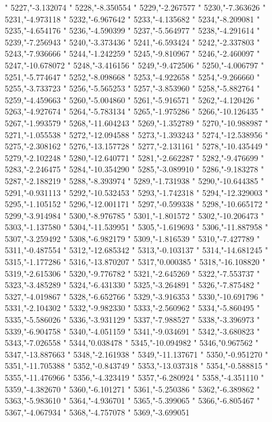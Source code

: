 "
5227,"-3.132074
"
5228,"-8.350554
"
5229,"-2.267577
"
5230,"-7.363626
"
5231,"-4.973118
"
5232,"-6.967642
"
5233,"-4.135682
"
5234,"-8.209081
"
5235,"-4.654176
"
5236,"-4.590399
"
5237,"-5.564977
"
5238,"-4.291614
"
5239,"-7.256943
"
5240,"-3.373436
"
5241,"-6.593424
"
5242,"-2.337803
"
5243,"-7.936666
"
5244,"-1.242259
"
5245,"-9.810967
"
5246,"-2.460097
"
5247,"-10.678072
"
5248,"-3.416156
"
5249,"-9.472506
"
5250,"-4.006797
"
5251,"-5.774647
"
5252,"-8.098668
"
5253,"-4.922658
"
5254,"-9.266660
"
5255,"-3.733723
"
5256,"-5.565253
"
5257,"-3.853960
"
5258,"-5.882764
"
5259,"-4.459663
"
5260,"-5.004860
"
5261,"-5.916571
"
5262,"-4.120426
"
5263,"-4.927674
"
5264,"-5.783134
"
5265,"-1.975286
"
5266,"-10.126435
"
5267,"-1.993579
"
5268,"-11.604243
"
5269,"-1.352789
"
5270,"-10.988987
"
5271,"-1.055538
"
5272,"-12.094588
"
5273,"-1.393243
"
5274,"-12.538956
"
5275,"-2.308162
"
5276,"-13.157728
"
5277,"-2.131161
"
5278,"-10.435449
"
5279,"-2.102248
"
5280,"-12.640771
"
5281,"-2.662287
"
5282,"-9.476699
"
5283,"-2.246475
"
5284,"-10.354290
"
5285,"-3.089910
"
5286,"-9.183278
"
5287,"-2.188219
"
5288,"-8.393974
"
5289,"-1.731938
"
5290,"-10.644385
"
5291,"-0.931113
"
5292,"-10.532453
"
5293,"-1.742318
"
5294,"-12.329003
"
5295,"-1.105152
"
5296,"-12.001171
"
5297,"-0.599338
"
5298,"-10.665172
"
5299,"-3.914984
"
5300,"-8.976785
"
5301,"-1.801572
"
5302,"-10.206473
"
5303,"-1.137580
"
5304,"-11.539951
"
5305,"-1.619693
"
5306,"-11.887958
"
5307,"-3.259492
"
5308,"-6.982179
"
5309,"-1.816539
"
5310,"-7.427789
"
5311,"-0.487554
"
5312,"-12.685342
"
5313,"-0.103137
"
5314,"-14.681245
"
5315,"-1.177286
"
5316,"-13.870207
"
5317,"0.000385
"
5318,"-16.108820
"
5319,"-2.615306
"
5320,"-9.776782
"
5321,"-2.645269
"
5322,"-7.553737
"
5323,"-3.485289
"
5324,"-6.431330
"
5325,"-3.264891
"
5326,"-7.875482
"
5327,"-4.019867
"
5328,"-6.652766
"
5329,"-3.916353
"
5330,"-10.691796
"
5331,"-2.104302
"
5332,"-9.982330
"
5333,"-2.560962
"
5334,"-5.860495
"
5335,"-5.586026
"
5336,"-3.931129
"
5337,"-7.988527
"
5338,"-3.396973
"
5339,"-6.904758
"
5340,"-4.051159
"
5341,"-9.034691
"
5342,"-3.680823
"
5343,"-7.026558
"
5344,"0.038478
"
5345,"-10.094982
"
5346,"0.967562
"
5347,"-13.887663
"
5348,"-2.161938
"
5349,"-11.137671
"
5350,"-0.951270
"
5351,"-11.705388
"
5352,"-0.843749
"
5353,"-13.037318
"
5354,"-0.588815
"
5355,"-11.476966
"
5356,"-4.323419
"
5357,"-6.280924
"
5358,"-4.351110
"
5359,"-4.382670
"
5360,"-6.101271
"
5361,"-5.250386
"
5362,"-6.389862
"
5363,"-5.983610
"
5364,"-4.936701
"
5365,"-5.399065
"
5366,"-6.805467
"
5367,"-4.067934
"
5368,"-4.757078
"
5369,"-3.699051
